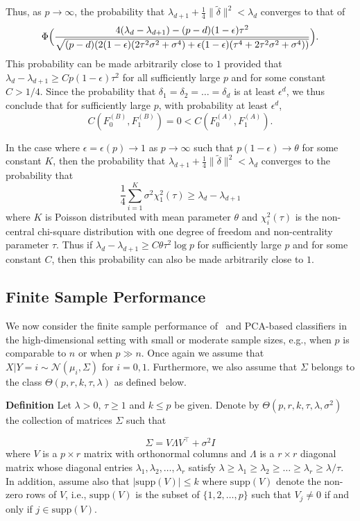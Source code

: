 \documentclass[10pt]{article}
\begin{document}
Thus, as $p \rightarrow \infty$, the probability that $\lambda_{d+1} + \tfrac{1}{4} \|\tilde{\delta}\|^{2} < \lambda_d$ converges to that of
$$\Phi\Bigl(\frac{4(\lambda_d - \lambda_{d+1}) - (p - d) (1 - \epsilon) \tau^2}{\sqrt{(p - d)(2 (1 - \epsilon) (2 \tau^2 \sigma^2 + \sigma^4) + \epsilon (1 - \epsilon) (\tau^4 + 2 \tau^2 \sigma^2 + \sigma^4))}} \Bigr).$$ This probability can be made arbitrarily close to $1$ provided that $\lambda_{d} - \lambda_{d+1} \geq Cp(1 - \epsilon) \tau^2$ for all sufficiently large $p$ and for some constant $C > 1/4$. Since the probability that $\delta_1 = \delta_2 = \dots = \delta_d$ is at least $\epsilon^{d}$, we thus conclude that for sufficiently large $p$, with probability at least $\epsilon^{d}$,
$$C(F_0^{(B)}, F_1^{(B)}) = 0 < C(F_0^{(A)}, F_1^{(A)}).$$

In the case where $\epsilon = \epsilon(p) \rightarrow 1$ as $p \rightarrow \infty$ such that $p(1 - \epsilon) \rightarrow \theta$ for some constant $K$, then the probability that $\lambda_{d+1} + \tfrac{1}{4} \|\tilde{\delta}\|^{2} < \lambda_d$ converges to the probability that
$$\frac{1}{4} \sum_{i=1}^{K} \sigma^2 \chi_{1}^{2}(\tau) \geq \lambda_{d} - \lambda_{d+1} $$
where $K$ is Poisson distributed with mean parameter $\theta$ and $\chi_{i}^{2}(\tau)$ is the non-central chi-square distribution with one degree of freedom and non-centrality parameter $\tau$. Thus if $\lambda_{d} - \lambda_{d+1} \geq C \theta \tau^2 \log{p}$ for sufficiently large $p$ and for some constant $C$, then this probability can also be made arbitrarily close to $1$.

\subsection{Finite Sample Performance}
We now consider the finite sample performance of \Lol~and PCA-based classifiers in the high-dimensional setting with small or moderate sample sizes, e.g., when $p$ is comparable to $n$ or when $p \gg n$. Once again we assume that $X | Y = i \sim \mathcal{N}(\mu_i, \Sigma)$ for $i = 0, 1$. Furthermore, we also assume that $\Sigma$ belongs to the class $\Theta(p,r,k,\tau,\lambda)$ as defined below.

{\bf Definition} Let $\lambda > 0$, $\tau \geq 1$ and $k \leq p$ be given. Denote by $\Theta(p,r,k,\tau,\lambda,\sigma^2)$ the collection of matrices $\Sigma$ such that

$$ \Sigma = V \Lambda V^{\top} + \sigma^2 I $$
where $V$ is a $p \times r$  matrix with orthonormal columns and $\Lambda$ is a $r \times r$ diagonal matrix whose diagonal entries $\lambda_1, \lambda_2, \dots, \lambda_r$ satisfy $\lambda \geq \lambda_1 \geq \lambda_2 \geq \dots \geq \lambda_r \geq \lambda/\tau$. In addition, assume also that $|\mathrm{supp}(V)| \leq k$ where $\mathrm{supp}(V)$ denote the non-zero rows of $V$, i.e., $\mathrm{supp}(V)$ is the subset of $\{1,2,\dots,p\}$ such that $V_j \not = 0$ if and only if $j \in \mathrm{supp}(V)$.
\end{document}
